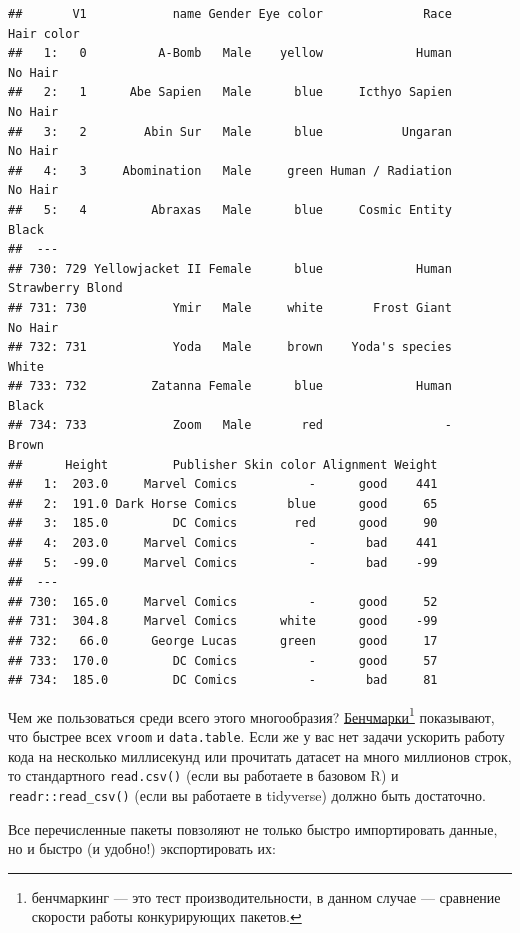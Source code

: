 \documentclass[]{book}
\begin{document}
\begin{verbatim}
##       V1            name Gender Eye color              Race       Hair color
##   1:   0          A-Bomb   Male    yellow             Human          No Hair
##   2:   1      Abe Sapien   Male      blue     Icthyo Sapien          No Hair
##   3:   2        Abin Sur   Male      blue           Ungaran          No Hair
##   4:   3     Abomination   Male     green Human / Radiation          No Hair
##   5:   4         Abraxas   Male      blue     Cosmic Entity            Black
##  ---                                                                        
## 730: 729 Yellowjacket II Female      blue             Human Strawberry Blond
## 731: 730            Ymir   Male     white       Frost Giant          No Hair
## 732: 731            Yoda   Male     brown    Yoda's species            White
## 733: 732         Zatanna Female      blue             Human            Black
## 734: 733            Zoom   Male       red                 -            Brown
##      Height         Publisher Skin color Alignment Weight
##   1:  203.0     Marvel Comics          -      good    441
##   2:  191.0 Dark Horse Comics       blue      good     65
##   3:  185.0         DC Comics        red      good     90
##   4:  203.0     Marvel Comics          -       bad    441
##   5:  -99.0     Marvel Comics          -       bad    -99
##  ---                                                     
## 730:  165.0     Marvel Comics          -      good     52
## 731:  304.8     Marvel Comics      white      good    -99
## 732:   66.0      George Lucas      green      good     17
## 733:  170.0         DC Comics          -      good     57
## 734:  185.0         DC Comics          -       bad     81
\end{verbatim}

Чем же пользоваться среди всего этого многообразия?
\href{https://www.danielecook.com/speeding-up-reading-and-writing-in-r/}{Бенчмарки}\footnote{бенчмаркинг
  --- это тест производительности, в данном случае --- сравнение
  скорости работы конкурирующих пакетов.} показывают, что быстрее всех
\texttt{vroom} и \texttt{data.table}. Если же у вас нет задачи ускорить
работу кода на несколько миллисекунд или прочитать датасет на много
миллионов строк, то стандартного \texttt{read.csv()} (если вы работаете
в базовом R) и \texttt{readr::read\_csv()} (если вы работаете в
tidyverse) должно быть достаточно.

Все перечисленные пакеты повзоляют не только быстро импортировать
данные, но и быстро (и удобно!) экспортировать их:
\end{document}
